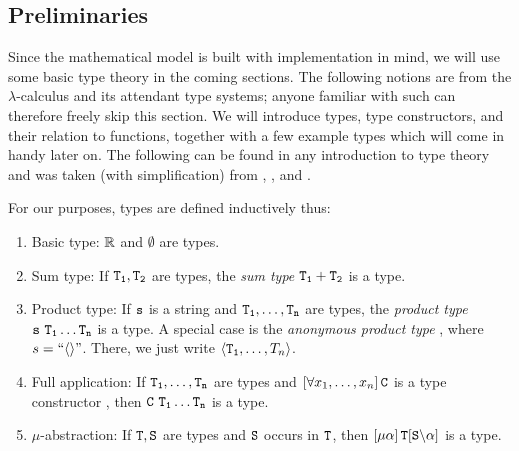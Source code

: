 \subsection{Preliminaries}\label{sec:mathematicalPreliminaries}

Since the mathematical model is built with implementation in mind, we will use some basic type theory in the coming sections. The following notions are from the $\lambda$-calculus and its attendant type systems; anyone familiar with such can therefore freely skip this section. We will introduce types, type constructors, and their relation to functions, together with a few example types which will come in handy later on. The following can be found in any introduction to type theory and was taken (with simplification) from \cite{Mendler:1988:IDT:913822}, \cite{typeIntroduction2}, and \cite{Jacobs97atutorial}.

\begin{definition}\label{def:type}
	For our purposes, types are defined inductively thus:
	\begin{enumerate}
		\item {\upshape Basic type:} $\mathbb{R}$ and $\emptyset$ are types.
		\item {\upshape Sum type:} If $\mathtt{T_1},\mathtt{T_2}$ are types, the {\em sum type} $\mathtt{T_1 + T_2}$ is a type. 
		\item {\upshape Product type:} If $\mathtt{s}$ is a string and $\mathtt{T_1},\dots,\mathtt{T_n}$ are types, the {\em product type} $\type{s}\ \type{T_1} \dots \type{T_n}$ is a type. A special case is the {\em anonymous product type} , where $s=``\langle\rangle"$. There, we just write $\langle\mathtt{T_1},\dots,T_n \rangle$.
		\item {\upshape Full application:} If $\mathtt{T_1},\dots,\mathtt{T_n}$ are types and $\left[\forall x_1,\dots,x_n \right] \mathtt{C}$ is a type constructor , then $\mathtt{C\ T_1} \dots \mathtt{T_n}$ is a type.
		\item {\upshape $\mu$-abstraction:} If $\mathtt{T}, \mathtt{S}$ are types and $\mathtt{S}$ occurs in $\mathtt{T}$, then $\left[\mu \alpha \right]\mathtt{T}[\mathtt{S}\backslash\alpha]$  is a type.
	\end{enumerate}
\end{definition}


